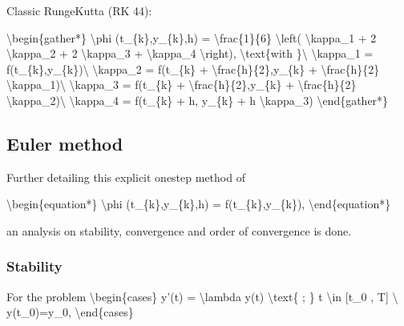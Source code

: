 \documentclass[letterpaper,10pt,english]{jupyterBook}
\begin{document}
\sphinxAtStartPar
Classic Runge\sphinxhyphen{}Kutta (RK 4\sphinxhyphen{}4):

\sphinxAtStartPar
\textbackslash{}begin\{gather*\}
\textbackslash{}phi (t\_\{k\},y\_\{k\},h) = \textbackslash{}frac\{1\}\{6\} \textbackslash{}left( \textbackslash{}kappa\_1 + 2 \textbackslash{}kappa\_2 + 2 \textbackslash{}kappa\_3 + \textbackslash{}kappa\_4 \textbackslash{}right), \textbackslash{}text\{with \}\textbackslash{}
\textbackslash{}kappa\_1 = f(t\_\{k\},y\_\{k\})\textbackslash{}
\textbackslash{}kappa\_2 = f(t\_\{k\} + \textbackslash{}frac\{h\}\{2\},y\_\{k\} + \textbackslash{}frac\{h\}\{2\} \textbackslash{}kappa\_1)\textbackslash{}
\textbackslash{}kappa\_3 = f(t\_\{k\} + \textbackslash{}frac\{h\}\{2\},y\_\{k\} + \textbackslash{}frac\{h\}\{2\} \textbackslash{}kappa\_2)\textbackslash{}
\textbackslash{}kappa\_4 = f(t\_\{k\} + h, y\_\{k\} + h \textbackslash{}kappa\_3)
\textbackslash{}end\{gather*\}


\subsection{Euler method}
\label{\detokenize{cap2:euler-method}}
\sphinxAtStartPar
Further detailing this explicit one\sphinxhyphen{}step method of

\sphinxAtStartPar
\textbackslash{}begin\{equation*\}
\textbackslash{}phi (t\_\{k\},y\_\{k\},h) = f(t\_\{k\},y\_\{k\}),
\textbackslash{}end\{equation*\}

\sphinxAtStartPar
an analysis on stability, convergence and order of convergence is done.


\subsubsection{Stability}
\label{\detokenize{cap2:stability}}
\sphinxAtStartPar
For the problem
\textbackslash{}begin\{cases\}
y’(t) = \sphinxhyphen{} \textbackslash{}lambda y(t) \textbackslash{}text\{ ; \} t \textbackslash{}in {[}t\_0 , T{]} \textbackslash{}
y(t\_0)=y\_0,
\textbackslash{}end\{cases\}
\end{document}
